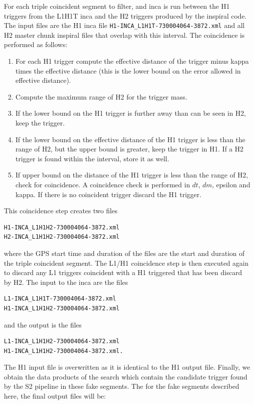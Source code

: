 For each triple coincident segment to filter, and inca is run between the H1
triggers from the L1H1T inca and the H2 triggers produced by the inspiral
code. The input files are the H1 inca file \verb|H1-INCA_L1H1T-730004064-3872.xml|
and all H2 master chunk inspiral files that overlap with this interval. The
coincidence is performed as follows:
\begin{enumerate}
\item For each H1 trigger compute the effective distance of the trigger minus
kappa times the effective distance (this is the lower bound on the error
allowed in effective distance).

\item Compute the maximum range of H2 for the trigger mass.

\item If the lower bound on the H1 trigger is further away than can be seen in
H2, keep the trigger.

\item If the lower bound on the effective distance of the H1 trigger is less
than the range of H2, but the upper bound is greater, keep the trigger in H1.
If a H2 trigger is found within the interval, store it as well.

\item If upper bound on the distance of the H1 trigger is less than the range
of H2, check for coincidence. A coincidence check is performed in $dt$, $dm$,
epsilon and kappa. If there is no coincident trigger discard the H1 trigger.
\end{enumerate}
This coincidence step creates two files
\begin{verbatim}
H1-INCA_L1H1H2-730004064-3872.xml
H2-INCA_L1H1H2-730004064-3872.xml
\end{verbatim}
where the GPS start time and duration of the files are the start and duration
of the triple coincident segment.  The L1/H1 coincidence step is then executed
again to discard any L1 triggers coincident with a H1 triggered that has been
discard by H2. The input to the inca are the files
\begin{verbatim}
L1-INCA_L1H1T-730004064-3872.xml
H1-INCA_L1H1H2-730004064-3872.xml
\end{verbatim}
and the output is the files
\begin{verbatim}
L1-INCA_L1H1H2-730004064-3872.xml
H1-INCA_L1H1H2-730004064-3872.xml.
\end{verbatim}
The H1 input file is overwritten as it is identical to the H1 output file.
Finally, we obtain the data products of the search which contain the candidate
trigger found by the S2 pipeline in these fake segments. The for the fake
segments described here, the final output files will be:

